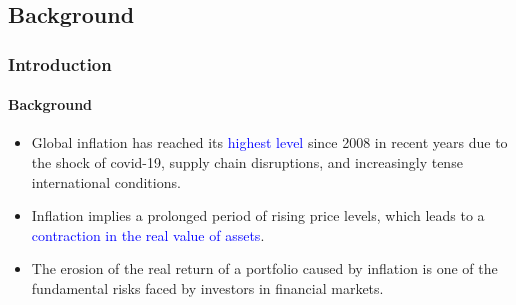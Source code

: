 \documentclass[
	11pt, %
]{beamer}
\begin{document}
\subsection{Background}
\begin{frame}
\frametitle{Introduction}
\framesubtitle{Background}
\begin{itemize}
\item Global inflation has reached its \textcolor{blue}{highest level} since 2008 in recent years due to the shock of covid-19, supply chain disruptions, and increasingly tense international conditions.\\
\bigskip
\item Inflation implies a prolonged period of rising price levels, which leads to  a \textcolor{blue}{contraction in the real value of assets}.\\
\bigskip
\item The erosion of the real return of a portfolio caused by inflation is one of the fundamental risks faced by investors in financial markets.\\
\end{itemize}
\end{frame}
\end{document}
